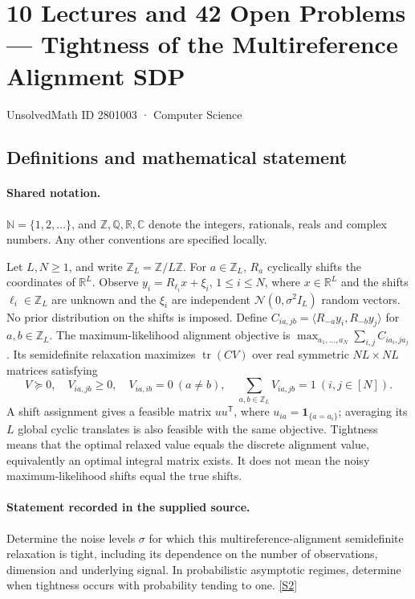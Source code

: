 \documentclass[11pt]{article}
\newcommand{\sref}[2]{\hyperlink{source:#1:#2}{[S#2]}}
\begin{document}
\setcounter{section}{2801002}
\section{10 Lectures and 42 Open Problems — Tightness of the Multireference Alignment SDP}\label{2801003}
{\small\sffamily UnsolvedMath ID 2801003 · Computer Science}
\subsection{Definitions and mathematical statement}

\paragraph{Shared notation.}$\mathbb N=\{1,2,\ldots\}$, and $\mathbb Z,\mathbb Q,\mathbb R,\mathbb C$ denote the integers, rationals, reals and complex numbers. Any other conventions are specified locally.


Let $L,N\ge1$, and write $\mathbb Z_L=\mathbb Z/L\mathbb Z$. For $a\in\mathbb Z_L$, $R_a$ cyclically shifts the coordinates of $\mathbb R^L$. Observe $y_i=R_{\ell_i}x+\xi_i$, $1\le i\le N$, where $x\in\mathbb R^L$ and the shifts $\ell_i\in\mathbb Z_L$ are unknown and the $\xi_i$ are independent $\mathcal N(0,\sigma^2 I_L)$ random vectors. No prior distribution on the shifts is imposed. Define $C_{ia,jb}=\langle R_{-a}y_i,R_{-b}y_j\rangle$ for $a,b\in\mathbb Z_L$. The maximum-likelihood alignment objective is $\max_{a_1,\ldots,a_N}\sum_{i,j}C_{ia_i,ja_j}$. Its semidefinite relaxation maximizes $\operatorname{tr}(CV)$ over real symmetric $NL\times NL$ matrices satisfying \[V\succeq0,\quad V_{ia,jb}\ge0,\quad V_{ia,ib}=0\ (a\ne b),\quad \sum_{a,b\in\mathbb Z_L}V_{ia,jb}=1\ (i,j\in[N]).\] A shift assignment gives a feasible matrix $u u^\mathsf T$, where $u_{ia}=\mathbf1_{\{a=a_i\}}$; averaging its $L$ global cyclic translates is also feasible with the same objective. Tightness means that the optimal relaxed value equals the discrete alignment value, equivalently an optimal integral matrix exists. It does not mean the noisy maximum-likelihood shifts equal the true shifts.
\paragraph{Statement recorded in the supplied source.}
Determine the noise levels $\sigma$ for which this multireference-alignment semidefinite relaxation is tight, including its dependence on the number of observations, dimension and underlying signal. In probabilistic asymptotic regimes, determine when tightness occurs with probability tending to one. \sref{2801003}{2}
\end{document}
